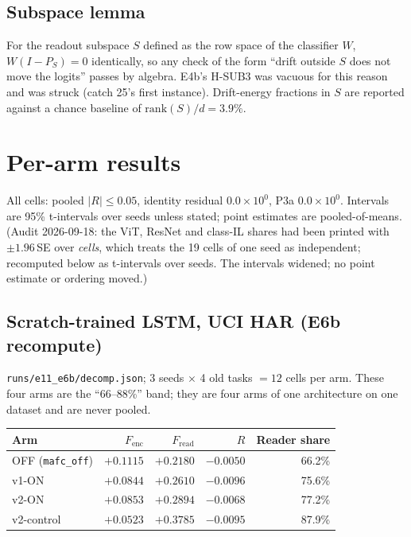 \subsection{Subspace lemma}

For the readout subspace $S$ defined as the row space of the classifier $W$,
$W(I - P_S) = 0$ identically, so any check of the form ``drift outside $S$ does
not move the logits'' passes by algebra. E4b's H-SUB3 was vacuous for this
reason and was struck (catch 25's first instance). Drift-energy fractions in
$S$ are reported against a chance baseline of $\mathrm{rank}(S)/d = 3.9\%$.

\section{Per-arm results}
\label{app:results}

All cells: pooled $|R| \le 0.05$, identity residual $0.0\times10^{0}$, P3a
$0.0\times10^{0}$. Intervals are 95\% t-intervals over seeds unless stated;
point estimates are pooled-of-means. (Audit 2026-09-18: the ViT, ResNet and
class-IL shares had been printed with $\pm1.96$\,SE over \emph{cells}, which
treats the 19 cells of one seed as independent; recomputed below as t-intervals
over seeds. The intervals widened; no point estimate or ordering moved.)

\subsection{Scratch-trained LSTM, UCI HAR (E6b recompute)}

\texttt{runs/e11\_e6b/decomp.json}; 3 seeds $\times$ 4 old tasks $=12$ cells per
arm. These four arms are the ``66--88\%'' band; they are four arms of one
architecture on one dataset and are never pooled.

\begin{center}\small
\begin{tabular}{@{}lrrrr@{}}
\toprule
Arm & $F_{\mathrm{enc}}$ & $F_{\mathrm{read}}$ & $R$ & Reader share \\
\midrule
OFF (\texttt{mafc\_off})   & $+0.1115$ & $+0.2180$ & $-0.0050$ & 66.2\% \\
v1-ON                       & $+0.0844$ & $+0.2610$ & $-0.0096$ & 75.6\% \\
v2-ON                       & $+0.0853$ & $+0.2894$ & $-0.0068$ & 77.2\% \\
v2-control                  & $+0.0523$ & $+0.3785$ & $-0.0095$ & 87.9\% \\
\bottomrule
\end{tabular}
\end{center}

